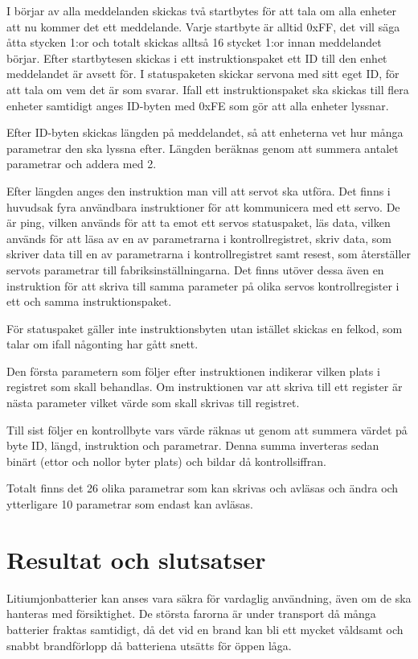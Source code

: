 \documentclass[a4paper,12pt]{article}
\begin{document}
I börjar av alla meddelanden skickas två startbytes för att tala om alla enheter att nu kommer det ett meddelande. Varje startbyte är alltid 0xFF, det vill säga åtta stycken 1:or och totalt skickas alltså 16 stycket 1:or innan meddelandet börjar. Efter startbytesen skickas i ett instruktionspaket ett ID till den enhet meddelandet är avsett för. I statuspaketen skickar servona med sitt eget ID, för att tala om vem det är som svarar. Ifall ett instruktionspaket ska skickas till flera enheter samtidigt anges ID-byten med 0xFE som gör att alla enheter lyssnar. 

Efter ID-byten skickas längden på meddelandet, så att enheterna vet hur många parametrar den ska lyssna efter. Längden beräknas genom att summera antalet parametrar och addera med 2.

 Efter längden anges den instruktion man vill att servot ska utföra. Det finns i huvudsak fyra användbara instruktioner för att kommunicera med ett servo. De är ping, vilken används för att ta emot ett servos statuspaket, läs data, vilken används för att läsa av en av parametrarna i kontrollregistret, skriv data, som skriver data till en av parametrarna i kontrollregistret samt resest, som återställer servots parametrar till fabriksinställningarna. Det finns utöver dessa även en instruktion för att skriva till samma parameter på olika servos kontrollregister i ett och samma instruktionspaket. 

För statuspaket gäller inte instruktionsbyten utan istället skickas en felkod, som talar om ifall någonting har gått snett.

Den första parametern som följer efter instruktionen indikerar vilken plats i registret som skall behandlas. Om instruktionen var att skriva till ett register är nästa parameter vilket värde som skall skrivas till registret. 

Till sist följer en kontrollbyte vars värde räknas ut genom att summera värdet på byte ID, längd, instruktion och parametrar. Denna summa inverteras sedan binärt (ettor och nollor byter plats) och bildar då kontrollsiffran.

Totalt finns det 26 olika parametrar som kan skrivas och avläsas och ändra och ytterligare 10 parametrar som endast kan avläsas. 
 
\section{Resultat och slutsatser}
Litiumjonbatterier kan anses vara säkra för vardaglig användning, även om de ska hanteras med försiktighet. De största farorna är under transport då många batterier fraktas samtidigt, då det vid en brand kan bli ett mycket våldsamt och snabbt brandförlopp då batteriena utsätts för öppen låga.
\end{document}
